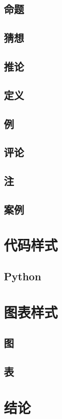 \subsection{命题}
\subsection{猜想}
\subsection{推论}
\subsection{定义}
\subsection{例}
\subsection{评论}
\subsection{注}
\subsection{案例}
\clearpage
\section[代码样式]{代码样式}
\subsection{Python}

\clearpage
\section[图表样式]{图表样式}
\subsection{图}
\subsection{表}
\clearpage
\section{结论}

